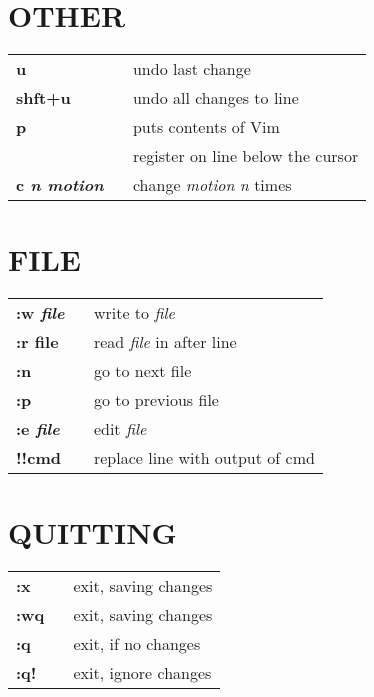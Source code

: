 \documentclass[10pt,landscape]{article}
\begin{document}
\begin{multicols*}{3}
\section{OTHER}
\begin{tabular}{@{\hspace{1mm}}ll@{}}
{\bfseries u} &~ undo last change \\
{\bfseries shft+u} &~ undo all changes to line \\
{\bfseries p} &~ puts contents of Vim \\ &~ register on line below the cursor \\
{\bfseries c {\em n motion}} &~ change {\em motion} {\em n} times  \\
\end{tabular}

\section{FILE}
\begin{tabular}{@{\hspace{1mm}}ll@{}}
{\bfseries :w {\em file}} &~ write to {\em file} \\
{\bfseries :r file} &~ read {\em file} in after line \\
{\bfseries :n} &~ go to next file \\
{\bfseries :p} &~ go to previous file \\
{\bfseries :e {\em file}} &~ edit {\em file} \\
{\bfseries !!cmd} &~ replace line with output of cmd \\
\end{tabular}


\section{QUITTING}
\begin{tabular}{@{\hspace{1mm}}ll@{}}
{\bfseries :x} &~ exit, saving changes \\
{\bfseries :wq} &~ exit, saving changes \\
{\bfseries :q} &~ exit, if no changes \\
{\bfseries :q!} &~ exit, ignore changes \\
\end{tabular}


\end{multicols*}
\end{document}
